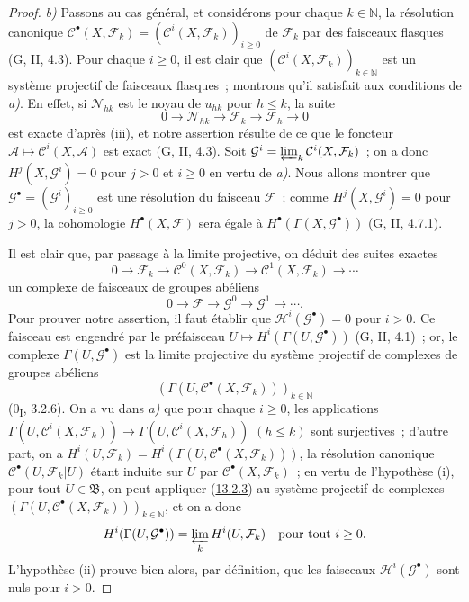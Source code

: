\begin{proof}
\emph{b)} Passons au cas général, et considérons pour chaque $k\in\mathbb N$,
la résolution canonique
$\mathcal C^\bullet(X,\mathcal F_k)
=(\mathcal C^i(X,\mathcal F_k))_{i\geq0}$ de $\mathcal F_k$ par des
faisceaux flasques (G, II, 4.3). Pour chaque $i\geq0$, il est clair que
$(\mathcal C^i(X,\mathcal F_k))_{k\in\mathbb N}$ est un système projectif
de faisceaux flasques~; montrons qu'il satisfait aux conditions de
\emph{a)}.
En effet, si $\mathcal N_{hk}$ est le noyau de $u_{hk}$ pour $h\leq k$, la
suite
\[
0\longrightarrow\mathcal N_{hk}\longrightarrow\mathcal F_k
\longrightarrow\mathcal F_h\longrightarrow0
\]
est exacte d'après (iii), et notre assertion résulte de ce que le foncteur
$\mathcal A\mapsto\mathcal C^i(X,\mathcal A)$ est exact (G, II, 4.3).
Soit
$\mathcal G^i=\varprojlim_k\mathcal C^i(X,\mathcal F_k)$~; on a donc
$H^j(X,\mathcal G^i)=0$ pour $j>0$ et $i\geq0$ en vertu de \emph{a)}. Nous
allons montrer que $\mathcal G^\bullet=(\mathcal G^i)_{i\geq0}$ est une
résolution du faisceau $\mathcal F$~; comme
$H^j(X,\mathcal G^i)=0$ pour $j>0$, la cohomologie $H^\bullet(X,\mathcal F)$
sera égale à $H^\bullet(\Gamma(X,\mathcal G^\bullet))$ (G, II, 4.7.1).

Il est clair que, par passage à la limite projective, on déduit des suites
exactes
\[
0\longrightarrow\mathcal F_k
\longrightarrow\mathcal C^0(X,\mathcal F_k)
\longrightarrow\mathcal C^1(X,\mathcal F_k)\longrightarrow\cdots
\]
un complexe de faisceaux de groupes abéliens
\[
0\longrightarrow\mathcal F\longrightarrow\mathcal G^0
\longrightarrow\mathcal G^1\longrightarrow\cdots.
\]
Pour prouver notre assertion, il faut établir que
$\mathcal H^i(\mathcal G^\bullet)=0$ pour $i>0$. Ce faisceau est engendré
par le préfaisceau
$U\mapsto H^i(\Gamma(U,\mathcal G^\bullet))$ (G, II, 4.1)~; or, le complexe
$\Gamma(U,\mathcal G^\bullet)$ est la limite projective du système
projectif de complexes de groupes abéliens
\[
(\Gamma(U,\mathcal C^\bullet(X,\mathcal F_k)))_{k\in\mathbb N}
\]
(0\textsubscript{I}, 3.2.6). On a vu dans \emph{a)} que pour chaque
$i\geq0$, les applications
$\Gamma(U,\mathcal C^i(X,\mathcal F_k))\to
\Gamma(U,\mathcal C^i(X,\mathcal F_h))$ $(h\leq k)$ sont surjectives~;
d'autre part, on a
$H^i(U,\mathcal F_k)=
H^i(\Gamma(U,\mathcal C^\bullet(X,\mathcal F_k)))$, la résolution canonique
$\mathcal C^\bullet(U,\mathcal F_k|U)$ étant induite sur $U$ par
$\mathcal C^\bullet(X,\mathcal F_k)$~; en vertu de l'hypothèse (i), pour
tout $U\in\mathfrak B$, on peut appliquer
(\hyperref[0.13.2.3-fr]{13.2.3}) au système projectif de complexes
$(\Gamma(U,\mathcal C^\bullet(X,\mathcal F_k)))_{k\in\mathbb N}$, et on a
donc
\[
H^i(\Gamma(U,\mathcal G^\bullet))
=\varprojlim_k H^i(U,\mathcal F_k)
\quad\hbox{pour tout }i\geq0.
\]
L'hypothèse (ii) prouve bien alors, par définition, que les faisceaux
$\mathcal H^i(\mathcal G^\bullet)$ sont nuls pour $i>0$.


\end{proof}
